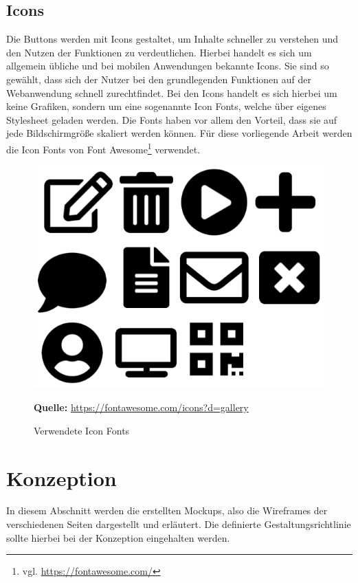 \subsection{Icons}
\label{subsec:icons}
Die Buttons werden mit Icons gestaltet, um Inhalte schneller zu verstehen und den Nutzen der Funktionen zu verdeutlichen. Hierbei handelt es sich um allgemein übliche und bei mobilen Anwendungen bekannte Icons. Sie sind so gewählt, dass sich der Nutzer bei den grundlegenden Funktionen auf der Webanwendung schnell zurechtfindet. Bei den Icons handelt es sich hierbei um keine Grafiken, sondern um eine sogenannte Icon Fonts, welche über eigenes Stylesheet geladen werden. Die Fonts haben vor allem den Vorteil, dass sie auf jede Bildschirmgröße skaliert werden können. Für diese vorliegende Arbeit werden die Icon Fonts von Font Awesome\footnote{vgl. \url{https://fontawesome.com/}} verwendet.\bigskip

\begin{figure}[H]
  \begin{center}
    \includegraphics[scale=0.5]{img/icons}
	\caption{Verwendete Icon Fonts} 
	\footnotesize\sffamily\textbf{Quelle:} \url{https://fontawesome.com/icons?d=gallery}  
	\label{fig:icons}
  \end{center}   
\end{figure}

\newpage
\section{Konzeption}
\label{sec:konzeption}
In diesem Abschnitt werden die erstellten Mockups, also die Wireframes der verschiedenen Seiten dargestellt und erläutert. Die definierte Gestaltungsrichtlinie sollte hierbei bei der Konzeption eingehalten werden.

